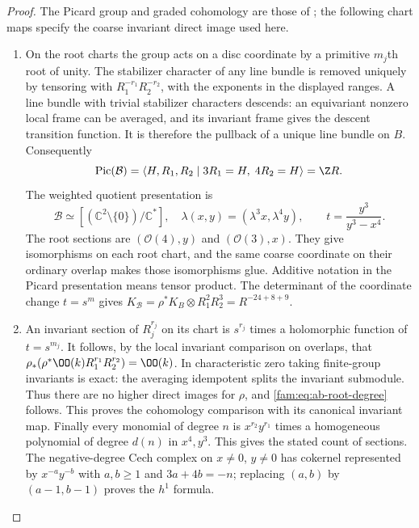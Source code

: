 \begin{proof}
The Picard group and graded cohomology are those of
\cite[Lemma~6.1, p.~74]{DuEtAl2026v1}; the following chart maps specify
the coarse invariant direct image used here.
\begin{enumerate}[label=\arabic*.,leftmargin=*]
\item On the root charts the group acts on a disc coordinate by a primitive
$m_j$th root of unity. The stabilizer character of any line bundle is
removed uniquely by tensoring with $R_1^{-r_1}R_2^{-r_2}$, with the
exponents in the displayed ranges. A line bundle with trivial stabilizer
characters descends: an equivariant nonzero local frame can be averaged,
and its invariant frame gives the descent transition function. It is
therefore the pullback of a unique line bundle on $B$. Consequently
\[
 \operatorname{Pic}(\mathcal B)=
 \langle H,R_1,R_2\mid 3R_1=H,\;4R_2=H\rangle=\Z R.
\]
The weighted quotient presentation is
\[
 \mathcal B\simeq[(\mathbb C^2\setminus\{0\})/\mathbb C^*],
 \quad\lambda(x,y)=(\lambda^3x,\lambda^4y),\qquad
 t=\frac{y^3}{y^3-x^4}.
\]
The root sections are $(\mathcal O(4),y)$ and $(\mathcal O(3),x)$.
They give isomorphisms on each root chart, and the same coarse
coordinate on their ordinary overlap makes those isomorphisms glue.
Additive notation in the Picard presentation means tensor product. The determinant of the coordinate change $t=s^m$ gives
$K_{\mathcal B}=\rho^*K_B\otimes R_1^2R_2^3=R^{-24+8+9}$.

\item An invariant section of $R_j^{r_j}$ on its chart is $s^{r_j}$ times a
holomorphic function of $t=s^{m_j}$. It follows, by the local invariant
comparison on overlaps, that
$\rho_*(\rho^*\OO(k)R_1^{r_1}R_2^{r_2})=\OO(k)$.
In characteristic zero taking finite-group invariants is exact: the
averaging idempotent splits the invariant submodule. Thus there are no
higher direct images for $\rho$, and \eqref{fam:eq:ab-root-degree} follows. This proves the
cohomology comparison with its canonical invariant map. Finally every monomial of degree $n$ is
$x^{r_2}y^{r_1}$ times a homogeneous polynomial of degree $d(n)$ in
$x^4,y^3$. This gives the stated count of sections. The negative-degree
Cech complex on $x\ne0$, $y\ne0$ has cokernel represented by
$x^{-a}y^{-b}$ with $a,b\ge1$ and $3a+4b=-n$; replacing $(a,b)$ by
$(a-1,b-1)$ proves the $h^1$ formula. \end{enumerate}
\end{proof}